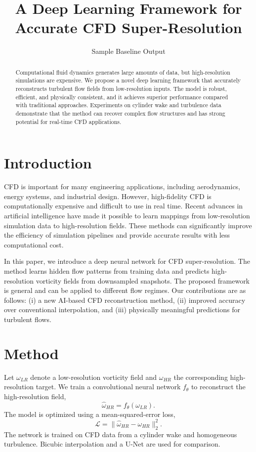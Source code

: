 \documentclass[11pt]{article}
\title{A Deep Learning Framework for Accurate CFD Super-Resolution}
\author{Sample Baseline Output}
\date{}
\begin{document}
\maketitle

\begin{abstract}
Computational fluid dynamics generates large amounts of data, but high-resolution simulations are expensive. We propose a novel deep learning framework that accurately reconstructs turbulent flow fields from low-resolution inputs. The model is robust, efficient, and physically consistent, and it achieves superior performance compared with traditional approaches. Experiments on cylinder wake and turbulence data demonstrate that the method can recover complex flow structures and has strong potential for real-time CFD applications.
\end{abstract}

\section{Introduction}
CFD is important for many engineering applications, including aerodynamics, energy systems, and industrial design. However, high-fidelity CFD is computationally expensive and difficult to use in real time. Recent advances in artificial intelligence have made it possible to learn mappings from low-resolution simulation data to high-resolution fields. These methods can significantly improve the efficiency of simulation pipelines and provide accurate results with less computational cost.

In this paper, we introduce a deep neural network for CFD super-resolution. The method learns hidden flow patterns from training data and predicts high-resolution vorticity fields from downsampled snapshots. The proposed framework is general and can be applied to different flow regimes. Our contributions are as follows: (i) a new AI-based CFD reconstruction method, (ii) improved accuracy over conventional interpolation, and (iii) physically meaningful predictions for turbulent flows.

\section{Method}
Let $\omega_{LR}$ denote a low-resolution vorticity field and $\omega_{HR}$ the corresponding high-resolution target. We train a convolutional neural network $f_\theta$ to reconstruct the high-resolution field,
\begin{equation}
    \hat{\omega}_{HR}=f_\theta(\omega_{LR}).
\end{equation}
The model is optimized using a mean-squared-error loss,
\begin{equation}
    \mathcal{L}=\|\hat{\omega}_{HR}-\omega_{HR}\|_2^2.
\end{equation}
The network is trained on CFD data from a cylinder wake and homogeneous turbulence. Bicubic interpolation and a U-Net are used for comparison.
\end{document}
